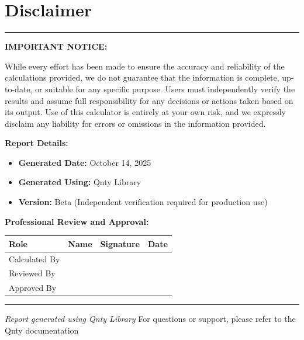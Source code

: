 \documentclass[11pt,a4paper]{article}
\begin{document}
\clearpage

\section*{Disclaimer}

\begin{center}
\rule{\textwidth}{0.4pt}
\end{center}

\noindent\textbf{IMPORTANT NOTICE:}

\noindent While every effort has been made to ensure the accuracy and reliability of the calculations provided, we do not guarantee that the information is complete, up-to-date, or suitable for any specific purpose. Users must independently verify the results and assume full responsibility for any decisions or actions taken based on its output. Use of this calculator is entirely at your own risk, and we expressly disclaim any liability for errors or omissions in the information provided.

\vspace{1em}

\noindent\textbf{Report Details:}
\begin{itemize}
\item \textbf{Generated Date:} October 14, 2025
\item \textbf{Generated Using:} Qnty Library
\item \textbf{Version:} Beta (Independent verification required for production use)
\end{itemize}

\vspace{2em}

\noindent\textbf{Professional Review and Approval:}

\vspace{1em}

\begin{longtable}{|p{3cm}|p{4cm}|p{4cm}|p{2.5cm}|}
\hline
\textbf{Role} & \textbf{Name} & \textbf{Signature} & \textbf{Date} \\
\hline
\hline
Calculated By & \rule{0pt}{1.5cm} & & \\
\hline
Reviewed By & \rule{0pt}{1.5cm} & & \\
\hline
Approved By & \rule{0pt}{1.5cm} & & \\
\hline
\end{longtable}

\vspace{1em}

\begin{center}
\rule{\textwidth}{0.4pt}
\vspace{0.5em}
\textit{Report generated using Qnty Library}
\vspace{0.5em}
{\footnotesize For questions or support, please refer to the Qnty documentation}
\end{center}
\end{document}
